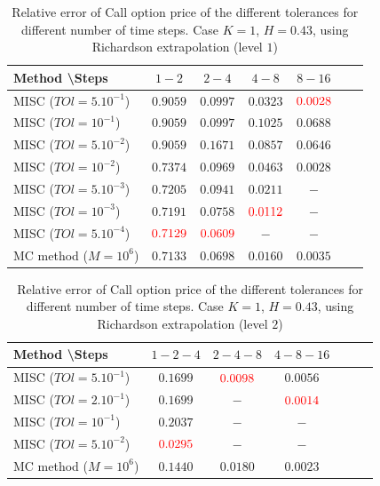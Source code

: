 \documentclass[11pt]{article}
\begin{document}
\begin{table}[h!]
	\centering
	\begin{tabular}{l*{5}{c}r}
		Method \textbackslash  Steps    &$1-2$        & $2-4$ & $4-8$ & $8-16$  \\
		\hline
		MISC ($TOl=5.10^{-1}$)  &$0.9059$ & $0.0997$ & $0.0323$ & ${\color{red}0.0028}$  \\
		MISC ($TOl=10^{-1}$)  &$0.9059$ &$0.0997$ & $0.1025$ & $0.0688$ \\
		MISC ($TOl=5.10^{-2}$)  &$0.9059$ & $0.1671$ & $0.0857$ & $0.0646$   \\
		MISC ($TOl=10^{-2}$)  & $0.7374$ &$0.0969$ & $0.0463$ & $0.0028$ \\		
			MISC ($TOl=5.10^{-3}$)  & $0.7205$ &$0.0941$ & $0.0211$ & $-$ \\	
				MISC ($TOl=10^{-3}$)  & $0.7191$ & $0.0758$ & ${\color{red}0.0112}$ & $-$ \\	
					MISC ($TOl=5.10^{-4}$)  &${\color{red}0.7129}$ & ${\color{red}0.0609}$ & $-$ & $-$ \\
		MC method ($M=10^{6}$)&$ \mathbf{0.7133}$    & $\mathbf{0.0698}$  & $\mathbf{0.0160}$  & $\mathbf{0.0035}$ \\
		\hline
	\end{tabular}
	\caption{Relative error of Call option price of the different tolerances for different number of time steps. Case $K=1$, $H=0.43$, using Richardson extrapolation (level $1$)}
	\label{Relative error of Call option price of the different tolerances for different number of time steps. Case $K=1, H=0.43$ , using Richardson extrapolation}
\end{table}



\begin{table}[h!]
	\centering
	\begin{tabular}{l*{5}{c}r}
		Method \textbackslash  Steps    &$1-2-4$        & $2-4-8$ & $4-8-16$   \\
		\hline
		MISC ($TOl=5.10^{-1}$)  &$ 0.1699$ & ${\color{red}0.0098}$ & $ 0.0056$   \\
			MISC ($TOl=2.10^{-1}$)  &$ 0.1699$ &$-$ & ${\color{red} 0.0014}$  \\
		MISC ($TOl=10^{-1}$)  &$0.2037$ &$-$ & $-$  \\
		MISC ($TOl=5.10^{-2}$)  &${\color{red}0.0295}$ & $-$ & $-$  \\
		MC method ($M=10^{6}$)&$\mathbf{0.1440}$    & $ \mathbf{0.0180}  $  & $\mathbf{0.0023}$   \\
		\hline
	\end{tabular}
	\caption{Relative error of Call option price of the different tolerances for different number of time steps. Case $K=1$, $H=0.43$, using Richardson extrapolation (level $2$)}
	\label{Relative error of Call option price of the different tolerances for different number of time steps. Case $K=1, H=0.43$ , using Richardson extrapolation_level2}
\end{table}
\newpage
\end{document}
